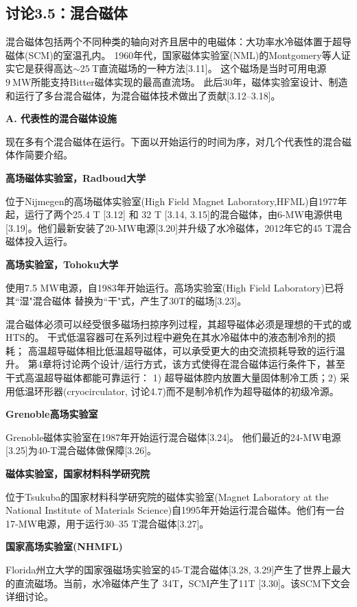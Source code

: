 \subsection{讨论3.5：混合磁体}
混合磁体包括两个不同种类的轴向对齐且居中的电磁体：大功率水冷磁体置于超导磁体(SCM)的室温孔内。
1960年代，国家磁体实验室(NML)的Montgomery等人证实它是获得高达$\sim 25\ \mathrm{T}$直流磁场的一种方法[3.11]。
这个磁场是当时可用电源$9\ \mathrm{MW}$所能支持Bitter磁体实现的最高直流场。
此后30年，磁体实验室设计、制造和运行了多台混合磁体，为混合磁体技术做出了贡献[3.12–3.18]。

\textbf{A. 代表性的混合磁体设施}

现在多有个混合磁体在运行。下面以开始运行的时间为序，对几个代表性的混合磁体作简要介绍。

\textbf{\kaishu 高场磁体实验室，Radboud大学}

位于Nijmegen的高场磁体实验室(High Field Magnet Laboratory,HFML)自1977年起，运行了两个25.4 T [3.12] 和 32 T [3.14, 3.15]的混合磁体，由6-MW电源供电[3.19]。他们最新安装了20-MW电源[3.20]并升级了水冷磁体，2012年它的45 T混合磁体投入运行。

\textbf{\kaishu 高场实验室，Tohoku大学}

使用7.5 MW电源，自1983年开始运行。高场实验室(High Field Laboratory)已将其``湿"混合磁体
替换为``干"式，产生了30T的磁场[3.23]。

混合磁体必须可以经受很多磁场扫掠序列过程，其超导磁体必须是理想的干式的或HTS的。
干式低温容器可在系列过程中避免在其水冷磁体中的液态制冷剂的损耗；
高温超导磁体相比低温超导磁体，可以承受更大的由交流损耗导致的运行温升。
第4章将讨论两个设计/运行方式，该方式使得在混合磁体运行条件下，甚至干式高温超导磁体都能可靠运行：
1) 超导磁体腔内放置大量固体制冷工质；2) 采用低温环形器(cryocirculator, 讨论4.7)而不是制冷机作为超导磁体的初级冷源。

\textbf{\kaishu Grenoble高场实验室}

Grenoble磁体实验室在1987年开始运行混合磁体[3.24]。
他们最近的24-MW电源[3.25]为40-T混合磁体做保障[3.26]。

\textbf{\kaishu 磁体实验室，国家材料科学研究院}

位于Tsukuba的国家材料科学研究院的磁体实验室(Magnet Laboratory at the National Institute of Materials Science)自1995年开始运行混合磁体。他们有一台17-MW电源，用于运行30–35 T混合磁体[3.27]。

\textbf{\kaishu 国家高场实验室(NHMFL)}

Florida州立大学的国家强磁场实验室的45-T混合磁体[3.28, 3.29]产生了世界上最大的直流磁场。当前，水冷磁体产生了
34T，SCM产生了11T [3.30]。该SCM下文会详细讨论。

